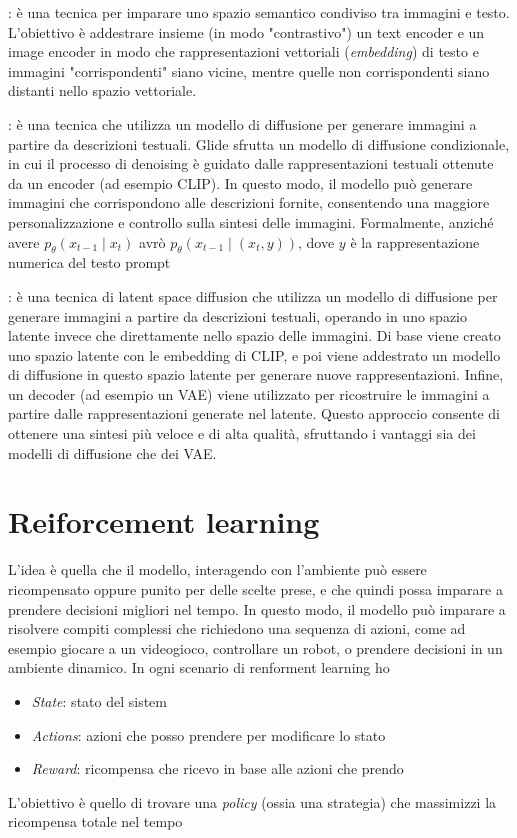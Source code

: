 \vskip3mm
: è una tecnica per imparare uno spazio semantico condiviso tra immagini e testo. L’obiettivo è addestrare insieme (in modo "contrastivo") un text encoder e un image encoder in modo che rappresentazioni vettoriali (\textit{embedding}) di testo e immagini "corrispondenti" siano vicine, mentre quelle non corrispondenti siano distanti nello spazio vettoriale.

\vskip3mm
: è una tecnica che utilizza un modello di diffusione per generare immagini a partire da descrizioni testuali. Glide sfrutta un modello di diffusione condizionale, in cui il processo di denoising è guidato dalle rappresentazioni testuali ottenute da un encoder (ad esempio CLIP). In questo modo, il modello può generare immagini che corrispondono alle descrizioni fornite, consentendo una maggiore personalizzazione e controllo sulla sintesi delle immagini. Formalmente, anziché avere $ p_{\theta}\left(x_{t-1} \mid x_t\right) $ avrò $ p_{\theta} \left(x_{t-1} \mid \left(x_t, y\right)\right)  $, dove $ y $ è la rappresentazione numerica del testo prompt

\vskip3mm
: è una tecnica di latent space diffusion che utilizza un modello di diffusione per generare immagini a partire da descrizioni testuali, operando in uno spazio latente invece che direttamente nello spazio delle immagini. Di base viene creato uno spazio latente con le embedding di CLIP, e poi viene addestrato un modello di diffusione in questo spazio latente per generare nuove rappresentazioni. Infine, un decoder (ad esempio un VAE) viene utilizzato per ricostruire le immagini a partire dalle rappresentazioni generate nel latente. Questo approccio consente di ottenere una sintesi più veloce e di alta qualità, sfruttando i vantaggi sia dei modelli di diffusione che dei VAE.

\section{Reiforcement learning}
L'idea è quella che il modello, interagendo con l'ambiente può essere ricompensato oppure punito per delle scelte prese, e che quindi possa imparare a prendere decisioni migliori nel tempo. In questo modo, il modello può imparare a risolvere compiti complessi che richiedono una sequenza di azioni, come ad esempio giocare a un videogioco, controllare un robot, o prendere decisioni in un ambiente dinamico. In ogni scenario di renforment learning ho
\begin{itemize}
	\item \textit{State}: stato del sistem
	\item \textit{Actions}: azioni che posso prendere per modificare lo stato
	\item \textit{Reward}: ricompensa che ricevo in base alle azioni che prendo
\end{itemize}
L'obiettivo è quello di trovare una \textit{policy} (ossia una strategia) che massimizzi la ricompensa totale nel tempo
